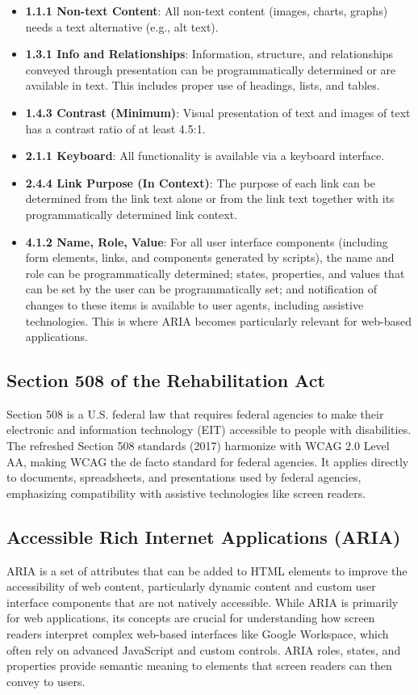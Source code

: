 \begin{itemize}
    \item \textbf{1.1.1 Non-text Content}: All non-text content (images, charts, graphs) needs a text alternative (e.g., alt text).
    \item \textbf{1.3.1 Info and Relationships}: Information, structure, and relationships conveyed through presentation can be programmatically determined or are available in text. This includes proper use of headings, lists, and tables.
    \item \textbf{1.4.3 Contrast (Minimum)}: Visual presentation of text and images of text has a contrast ratio of at least 4.5:1.
    \item \textbf{2.1.1 Keyboard}: All functionality is available via a keyboard interface.
    \item \textbf{2.4.4 Link Purpose (In Context)}: The purpose of each link can be determined from the link text alone or from the link text together with its programmatically determined link context.
    \item \textbf{4.1.2 Name, Role, Value}: For all user interface components (including form elements, links, and components generated by scripts), the name and role can be programmatically determined; states, properties, and values that can be set by the user can be programmatically set; and notification of changes to these items is available to user agents, including assistive technologies. This is where ARIA becomes particularly relevant for web-based applications.
\end{itemize}

\subsection{Section 508 of the Rehabilitation Act}
Section 508\cite{Section508} is a U.S. federal law that requires federal agencies to make their electronic and information technology (EIT) accessible to people with disabilities. The refreshed Section 508 standards (2017) harmonize with WCAG 2.0 Level AA, making WCAG the de facto standard for federal agencies. It applies directly to documents, spreadsheets, and presentations used by federal agencies, emphasizing compatibility with assistive technologies like screen readers.

\subsection{Accessible Rich Internet Applications (ARIA)}
ARIA\cite{ARIA} is a set of attributes that can be added to HTML elements to improve the accessibility of web content, particularly dynamic content and custom user interface components that are not natively accessible. While ARIA is primarily for web applications, its concepts are crucial for understanding how screen readers interpret complex web-based interfaces like Google Workspace, which often rely on advanced JavaScript and custom controls. ARIA roles, states, and properties provide semantic meaning to elements that screen readers can then convey to users.

